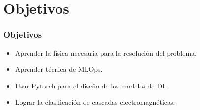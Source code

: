 \documentclass{beamer}
\begin{document}
\section{Objetivos}
\begin{frame}
  \frametitle{Objetivos}
  \begin{itemize}
    \item Aprender la física necesaria para la resolución del problema.
    \item Aprender técnica de MLOps.
    \item Usar Pytorch para el diseño de los modelos de DL.
    \item Lograr la clasificación de cascadas electromagnéticas.
  \end{itemize}
\end{frame}

\end{document}
